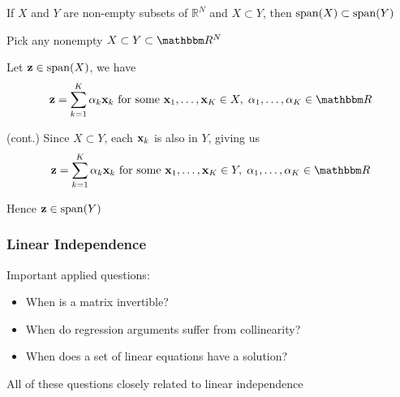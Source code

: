 \begin{frame}
    
    \vspace{2em}
    \Fact{\eqref{ET-fa:xsys}} 
    If $X$ and $Y$ are non-empty subsets of $\mathbb{R}^{N}$ and $X \subset Y$, 
    then $\operatorname{span}(X) \subset \operatorname{span}(Y)$
    \vspace{2em}
    
    \Prf
    Pick any nonempty $X \subset Y \subset \RR^N$
    
    Let ${\mathbf z} \in \operatorname{span}(X)$, we have
    \begin{equation*}
        \boldz = \sum_{k=1}^K \alpha_k \boldx_k 
        \text{ for some }
        \boldx_1, \ldots, \boldx_K \in X, \; 
        \alpha_1, \ldots, \alpha_K \in \RR
    \end{equation*}
    
\end{frame}

\begin{frame}

   \vspace{2em}
    \Prf(cont.)
    Since $X \subset Y$, each ${\mathbf x}_k$ is also in $Y$, giving us
    \begin{equation*}
        \boldz = \sum_{k=1}^K \alpha_k \boldx_k 
        \text{ for some }
        \boldx_1, \ldots, \boldx_K \in Y, \; 
        \alpha_1, \ldots, \alpha_K \in \RR
    \end{equation*}

    \vspace{.7em}
    Hence ${\mathbf z} \in \operatorname{span}(Y)$

\end{frame}


\begin{frame}
    \frametitle{Linear Independence}
    
    \vspace{2em}
    Important applied questions:

    \begin{itemize}
        \item When is a matrix invertible?
        \item When do regression arguments suffer from collinearity?
        \item When does a set of linear equations have a solution?
    \end{itemize}

    All of these questions closely related to linear independence 

\end{frame}


